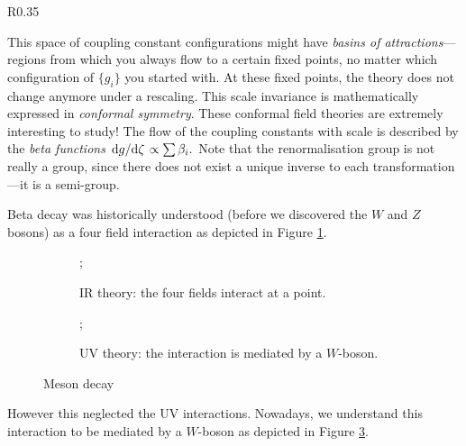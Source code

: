 \begin{wrapfigure}{R}{0.35\columnwidth}
  \centering
  \def\svgwidth{0.3\columnwidth}
  
  \caption{RG flow in parameter space}
  \label{fig:l8f1}
\end{wrapfigure}
This space of coupling constant configurations might have \emph{basins of attractions}---regions from which you always flow to a certain fixed points, no matter which configuration of $\{g_i \}$ you started with.
At these fixed points, the theory does not change anymore under a rescaling. This scale invariance is mathematically expressed in \emph{conformal symmetry}. These conformal field theories are extremely interesting to study!
The flow of the coupling constants with scale is described by the \emph{beta functions} $\dv*{g}{\zeta} \propto \sum \beta_i.$
Note that the renormalisation group is not really a group, since there does not exist a unique inverse to each transformation---it is a semi-group.
\begin{example}[]
  Beta decay was historically understood (before we discovered the $W$ and $Z$ bosons) as a four field interaction as depicted in Figure \ref{fig:beta1}.
  \begin{figure}[bt]
    \begin{subfigure}[t]{0.5\textwidth}
      \centering
      ;
      \caption{IR theory: the four fields interact at a point.}
      \label{fig:beta1}
    \end{subfigure}
    \begin{subfigure}[t]{0.5\textwidth}
      \centering
      ;
      \caption{UV theory: the interaction is mediated by a $W$-boson.}
      \label{fig:beta2}
    \end{subfigure}
    \caption{Meson decay}
  \end{figure}
  However this neglected the UV interactions. Nowadays, we understand this interaction to be mediated by a $W$-boson as depicted in Figure \ref{fig:beta2}.
\end{example}
